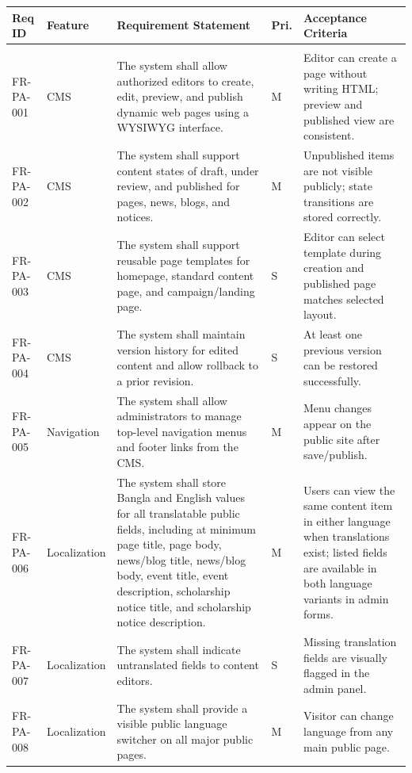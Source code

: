 \documentclass[12pt,a4paper]{article}
\newcommand{\thead}[1]{\textbf{\color{white}#1}}
\newcommand{\theadrow}{\rowcolor{headerblue}}
\begin{document}
\begin{longtable}{@{}L{2cm}L{2.4cm}L{6cm}C{0.9cm}L{3.4cm}@{}}
\theadrow \thead{Req ID} & \thead{Feature} & \thead{Requirement Statement} & \thead{Pri.} & \thead{Acceptance Criteria} \\
\endhead

\\
FR-PA-001 & CMS & The system shall allow authorized editors to create, edit, preview, and publish dynamic web pages using a WYSIWYG interface. & M & Editor can create a page without writing HTML; preview and published view are consistent. \\
FR-PA-002 & CMS & The system shall support content states of draft, under review, and published for pages, news, blogs, and notices. & M & Unpublished items are not visible publicly; state transitions are stored correctly. \\
FR-PA-003 & CMS & The system shall support reusable page templates for homepage, standard content page, and campaign/landing page. & S & Editor can select template during creation and published page matches selected layout. \\
FR-PA-004 & CMS & The system shall maintain version history for edited content and allow rollback to a prior revision. & S & At least one previous version can be restored successfully. \\
FR-PA-005 & Navigation & The system shall allow administrators to manage top-level navigation menus and footer links from the CMS. & M & Menu changes appear on the public site after save/publish. \\
FR-PA-006 & Localization & The system shall store Bangla and English values for all translatable public fields, including at minimum page title, page body, news/blog title, news/blog body, event title, event description, scholarship notice title, and scholarship notice description. & M & Users can view the same content item in either language when translations exist; listed fields are available in both language variants in admin forms. \\
FR-PA-007 & Localization & The system shall indicate untranslated fields to content editors. & S & Missing translation fields are visually flagged in the admin panel. \\
FR-PA-008 & Localization & The system shall provide a visible public language switcher on all major public pages. & M & Visitor can change language from any main public page. \\

\end{longtable}
\end{document}
